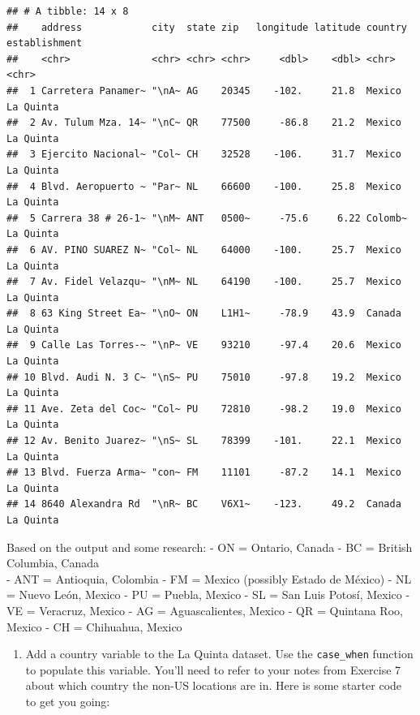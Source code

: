 \documentclass[
]{article}
\providecommand{\tightlist}{%
  \setlength{\itemsep}{0pt}\setlength{\parskip}{0pt}}
\begin{document}
\begin{verbatim}
## # A tibble: 14 x 8
##    address            city  state zip   longitude latitude country establishment
##    <chr>              <chr> <chr> <chr>     <dbl>    <dbl> <chr>   <chr>        
##  1 Carretera Panamer~ "\nA~ AG    20345    -102.     21.8  Mexico  La Quinta    
##  2 Av. Tulum Mza. 14~ "\nC~ QR    77500     -86.8    21.2  Mexico  La Quinta    
##  3 Ejercito Nacional~ "Col~ CH    32528    -106.     31.7  Mexico  La Quinta    
##  4 Blvd. Aeropuerto ~ "Par~ NL    66600    -100.     25.8  Mexico  La Quinta    
##  5 Carrera 38 # 26-1~ "\nM~ ANT   0500~     -75.6     6.22 Colomb~ La Quinta    
##  6 AV. PINO SUAREZ N~ "Col~ NL    64000    -100.     25.7  Mexico  La Quinta    
##  7 Av. Fidel Velazqu~ "\nM~ NL    64190    -100.     25.7  Mexico  La Quinta    
##  8 63 King Street Ea~ "\nO~ ON    L1H1~     -78.9    43.9  Canada  La Quinta    
##  9 Calle Las Torres-~ "\nP~ VE    93210     -97.4    20.6  Mexico  La Quinta    
## 10 Blvd. Audi N. 3 C~ "\nS~ PU    75010     -97.8    19.2  Mexico  La Quinta    
## 11 Ave. Zeta del Coc~ "Col~ PU    72810     -98.2    19.0  Mexico  La Quinta    
## 12 Av. Benito Juarez~ "\nS~ SL    78399    -101.     22.1  Mexico  La Quinta    
## 13 Blvd. Fuerza Arma~ "con~ FM    11101     -87.2    14.1  Mexico  La Quinta    
## 14 8640 Alexandra Rd  "\nR~ BC    V6X1~    -123.     49.2  Canada  La Quinta
\end{verbatim}

Based on the output and some research: - ON = Ontario, Canada - BC =
British Columbia, Canada\\
- ANT = Antioquia, Colombia - FM = Mexico (possibly Estado de México) -
NL = Nuevo León, Mexico - PU = Puebla, Mexico - SL = San Luis Potosí,
Mexico - VE = Veracruz, Mexico - AG = Aguascalientes, Mexico - QR =
Quintana Roo, Mexico - CH = Chihuahua, Mexico

\begin{enumerate}
\def\labelenumi{\arabic{enumi}.}
\setcounter{enumi}{7}
\tightlist
\item
  Add a country variable to the La Quinta dataset. Use the
  \texttt{case\_when} function to populate this variable. You'll need to
  refer to your notes from Exercise 7 about which country the non-US
  locations are in. Here is some starter code to get you going:
\end{enumerate}
\end{document}
